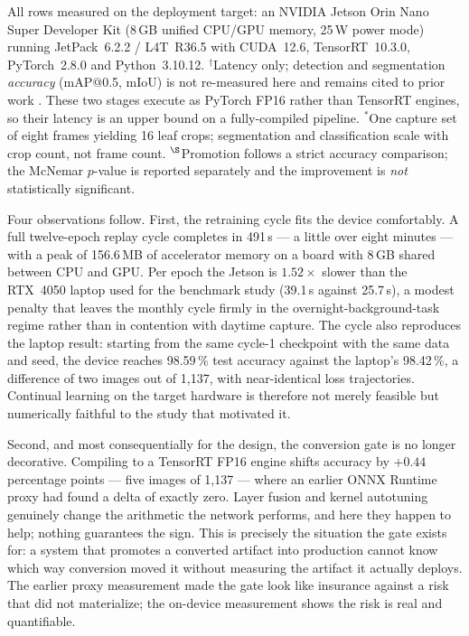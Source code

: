 \documentclass[journal]{IEEEtran}
\begin{document}
\begin{table}[!tbp]
\vspace{2pt}
\begin{minipage}{\columnwidth}
\footnotesize All rows measured on the deployment target: an NVIDIA Jetson Orin Nano
Super Developer Kit (8\,GB unified CPU/GPU memory, 25\,W power mode) running
JetPack~6.2.2 / L4T~R36.5 with CUDA~12.6, TensorRT~10.3.0, PyTorch~2.8.0 and
Python~3.10.12. $^{\dagger}$Latency only;
detection and segmentation \emph{accuracy} (mAP@0.5, mIoU) is not re-measured here
and remains cited to prior work \cite{ref21}. These two stages execute as PyTorch
FP16 rather than TensorRT engines, so their latency is an upper bound on a
fully-compiled pipeline. $^{\ast}$One capture set of eight frames yielding 16 leaf
crops; segmentation and classification scale with crop count, not frame count.
$^{\S}$Promotion follows a strict accuracy comparison; the McNemar $p$-value is
reported separately and the improvement is \emph{not} statistically significant.
\end{minipage}
\end{table}

Four observations follow. First, the retraining cycle fits the device comfortably.
A full twelve-epoch replay cycle completes in 491\,s --- a little over eight
minutes --- with a peak of 156.6\,MB of accelerator memory on a board with 8\,GB
shared between CPU and GPU. Per epoch the Jetson is $1.52\times$ slower than the
RTX~4050 laptop used for the benchmark study (39.1\,s against 25.7\,s), a modest
penalty that leaves the monthly cycle firmly in the overnight-background-task
regime rather than in contention with daytime capture. The cycle also reproduces
the laptop result: starting from the same cycle-1 checkpoint with the same data and
seed, the device reaches 98.59\,\% test accuracy against the laptop's 98.42\,\%, a
difference of two images out of 1{,}137, with near-identical loss trajectories.
Continual learning on the target hardware is therefore not merely feasible but
numerically faithful to the study that motivated it.

Second, and most consequentially for the design, the conversion gate is no longer
decorative. Compiling to a TensorRT FP16 engine shifts accuracy by $+0.44$
percentage points --- five images of 1{,}137 --- where an earlier ONNX Runtime proxy
had found a delta of exactly zero. Layer fusion and kernel autotuning genuinely
change the arithmetic the network performs, and here they happen to help; nothing
guarantees the sign. This is precisely the situation the gate exists for: a system
that promotes a converted artifact into production cannot know which way conversion
moved it without measuring the artifact it actually deploys. The earlier
proxy measurement made the gate look like insurance against a risk that did not
materialize; the on-device measurement shows the risk is real and quantifiable.
\end{document}
